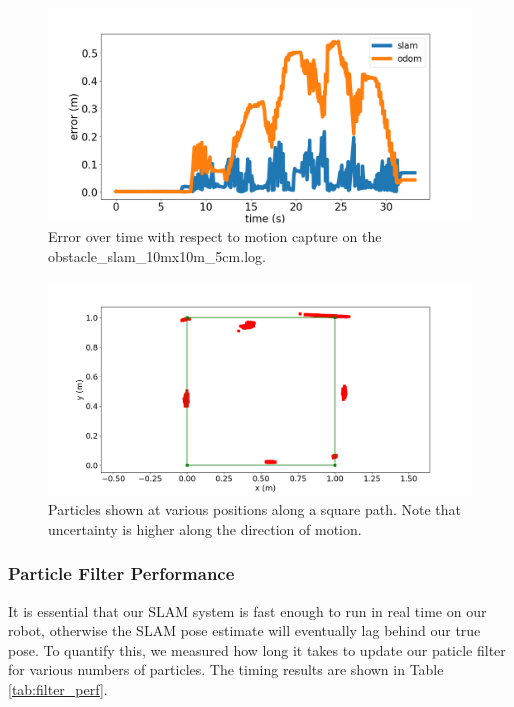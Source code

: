 \documentclass[journal]{IEEEtran}
\begin{document}
            \begin{figure}[t]
                \centering
                \includegraphics[width=1\linewidth]{localization_error.png}
                \caption{Error over time with respect to motion capture on the obstacle\_slam\_10mx10m\_5cm.log.}
                \label{fig:localization_error}
            \end{figure}
        
            \begin{figure}[b]
                \centering
                \includegraphics[width=1\linewidth]{drive_square_particles.png}
                \caption{Particles shown at various positions along a square path. Note that uncertainty is higher along the direction of motion.}
                \label{fig:square_particles}
            \end{figure}
    
        \subsubsection{Particle Filter Performance}
        
            It is essential that our SLAM system is fast enough to run in real time on our robot, otherwise the SLAM pose estimate will eventually lag behind our true pose. To quantify this, we measured how long it takes to update our paticle filter for various numbers of particles. The timing results are shown in Table \ref{tab:filter_perf}.
    
\end{document}
